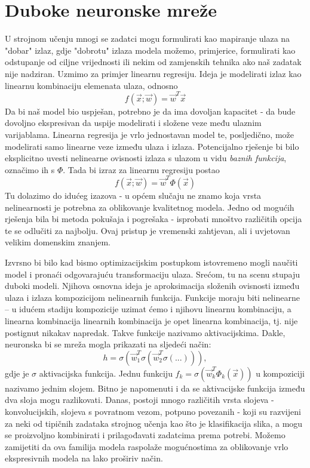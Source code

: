 \section{Duboke neuronske mreže}
U strojnom učenju mnogi se zadatci mogu formulirati kao mapiranje ulaza na "dobar" izlaz, gdje "dobrotu" izlaza modela možemo, primjerice, formulirati kao odstupanje od ciljne vrijednosti ili nekim od zamjenskih tehnika ako naš zadatak nije nadziran. Uzmimo za primjer linearnu regresiju. Ideja je modelirati izlaz kao linearnu kombinaciju elemenata ulaza, odnosno
\begin{equation*}
	f(\vec{x}; \vec{w}) = \vec{w}^T\vec{x}
\end{equation*}
Da bi naš model bio uspješan, potrebno je da ima dovoljan kapacitet - da bude dovoljno ekspresivan da uspije modelirati i složene veze među ulaznim varijablama. Linearna regresija je vrlo jednostavan model te, posljedično, može modelirati samo linearne veze između ulaza i izlaza. Potencijalno rješenje bi bilo eksplicitno uvesti nelinearne ovisnosti izlaza s ulazom u vidu \textit{baznih funkcija}, označimo ih s $\Phi$. Tada bi izraz za linearnu regresiju postao
\begin{equation*}
	f(\vec{x}; \vec{w}) = \vec{w}^T\Phi(\vec{x})
\end{equation*}
Tu dolazimo do idućeg izazova - u općem slučaju ne znamo koja vrsta nelinearnosti je potrebna za oblikovanje kvalitetnog modela. Jedno od mogućih rješenja bila bi metoda pokušaja i pogrešaka - isprobati mnoštvo različitih opcija te se odlučiti za najbolju. Ovaj pristup je vremenski zahtjevan, ali i uvjetovan velikim domenskim znanjem. 

Izvrsno bi bilo kad bismo optimizacijskim postupkom istovremeno mogli naučiti model i pronaći odgovarajuću transformaciju ulaza. Srećom, tu na scenu stupaju duboki modeli. Njihova osnovna ideja je aproksimacija složenih ovisnosti između ulaza i izlaza kompozicijom nelinearnih funkcija. Funkcije moraju biti nelinearne -- u idućem stadiju kompozicije uzimat ćemo i njihovu linearnu kombinaciju, a linearna kombinacija linearnih kombinacija je opet linearna kombinacija, tj. nije postignut nikakav napredak. Takve funkcije nazivamo aktivacijskima. Dakle, neuronska bi se mreža mogla prikazati na sljedeći način:
\begin{equation*}
	h = \sigma(\vec{w}_1^T\sigma(\vec{w}_2^T\sigma(...))),
\end{equation*}
gdje je $\sigma$ aktivacijska funkcija. Jednu funkciju $f_k = \sigma(\vec{w}_k^T\Phi_k(\vec{x}))$ u kompoziciji nazivamo jednim slojem. Bitno je napomenuti i da se aktivacijske funkcija između dva sloja mogu razlikovati. Danas, postoji mnogo različitih vrsta slojeva - konvolucijskih, slojeva s povratnom vezom, potpuno povezanih - koji su razvijeni za neki od tipičnih zadataka strojnog učenja kao što je klasifikacija slika, a mogu se proizvoljno kombinirati i prilagođavati zadatcima prema potrebi. Možemo zamijetiti da ova familija modela raspolaže mogućnostima za oblikovanje vrlo ekspresivnih modela na lako proširiv način.

